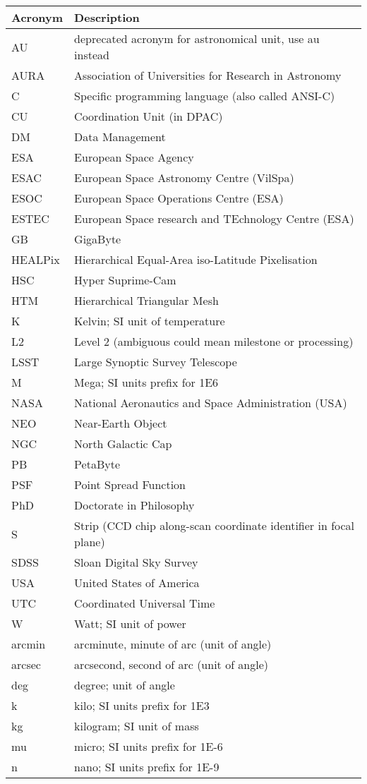 \addtocounter{table}{-1}
\begin{longtable}{|l|p{}|}\hline
\textbf{Acronym} & \textbf{Description}  \\\hline

AU&deprecated acronym for astronomical unit, use au instead \\\hline
AURA&Association of Universities for Research in Astronomy \\\hline
C&Specific programming language (also called ANSI-C) \\\hline
CU&Coordination Unit (in DPAC) \\\hline
DM&Data Management \\\hline
ESA&European Space Agency \\\hline
ESAC&European Space Astronomy Centre (VilSpa) \\\hline
ESOC&European Space Operations Centre (ESA) \\\hline
ESTEC&European Space research and TEchnology Centre (ESA) \\\hline
GB&GigaByte \\\hline
HEALPix&Hierarchical Equal-Area iso-Latitude Pixelisation \\\hline
HSC&Hyper Suprime-Cam \\\hline
HTM&Hierarchical Triangular Mesh \\\hline
K&Kelvin; SI unit of temperature \\\hline
L2&Level 2 (ambiguous could mean milestone or processing) \\\hline
LSST&Large Synoptic Survey Telescope \\\hline
M&Mega; SI units prefix for 1E6 \\\hline
NASA&National Aeronautics and Space Administration (USA) \\\hline
NEO&Near-Earth Object \\\hline
NGC&North Galactic Cap \\\hline
PB&PetaByte \\\hline
PSF&Point Spread Function \\\hline
PhD&Doctorate in Philosophy \\\hline
S&Strip (CCD chip along-scan coordinate identifier in focal plane) \\\hline
SDSS&Sloan Digital Sky Survey \\\hline
USA&United States of America \\\hline
UTC&Coordinated Universal Time \\\hline
W&Watt; SI unit of power \\\hline
arcmin&arcminute, minute of arc (unit of angle) \\\hline
arcsec&arcsecond, second of arc (unit of angle) \\\hline
deg&degree; unit of angle \\\hline
k&kilo; SI units prefix for 1E3 \\\hline
kg&kilogram; SI unit of mass \\\hline
mu&micro; SI units prefix for 1E-6 \\\hline
n&nano; SI units prefix for 1E-9 \\\hline
\end{longtable}
